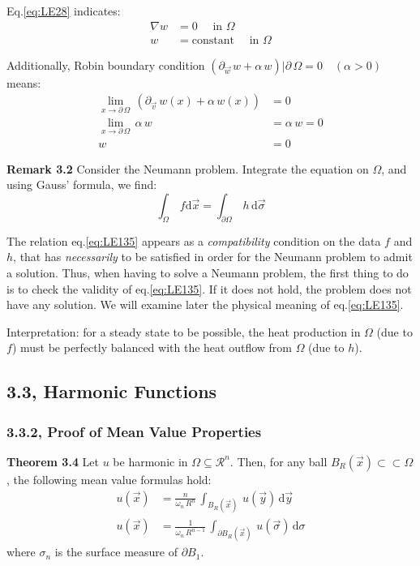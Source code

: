 \documentclass[../main.tex]{subfiles}
\begin{document}
Eq.\ref{eq:LE28} indicates:
\begin{align}
    \nabla w &= 0 \quad \text{ in  } \Omega \label{eq:LE30} \\
    w &= \text{constant} \quad \text{ in  } \Omega \label{eq:LE31}
\end{align}

Additionally, Robin boundary condition $(\partial_{\vec{w}} \, w + \alpha \, w)|\partial \, \Omega  = 0 \quad (\alpha > 0)$ means:
\begin{align}
    \lim_{x \rightarrow \partial \, \Omega} \,  (\partial_{\vec{v}} \, w(x) + \alpha \, w(x)) &= 0 \label{eq:LE32} \\
    \lim_{x \rightarrow \partial \, \Omega} \, \alpha \, w &= \alpha \, w = 0 \label{eq:LE33} \\
    w &= 0 \label{eq:LE34}
\end{align} \hfill \Box

\textbf{Remark 3.2}  Consider the Neumann problem. Integrate the equation on $\Omega$, and using Gauss' formula, we find:
\begin{equation} \label{eq:LE135}
    \int_{\Omega} \, f \mathrm{d} \vec{x} = \int_{\partial \Omega} \, h \, \mathrm{d} \vec{\sigma}
\end{equation} 

The relation eq.\ref{eq:LE135} appears as a \textit{compatibility} condition on the data $f$ and $h$, that has \textit{necessarily} to be satisfied in order for the Neumann problem to admit a solution. Thus, when having to solve a Neumann problem, the first thing to do is to check the validity of eq.\ref{eq:LE135}. If it does not hold, the problem does not have any solution. We will examine later the physical meaning of eq.\ref{eq:LE135}.

Interpretation: for a steady state to be possible, the heat production in $\Omega$ (due to $f$) must be perfectly balanced with the heat outflow from $\Omega$ (due to $h$). \hfill \Box

\subsection{3.3, Harmonic Functions}

\subsubsection{3.3.2, Proof of Mean Value Properties}

\textbf{Theorem 3.4}  Let $u$ be harmonic in $\Omega \subseteq \mathcal{R}^n$. Then, for any ball $B_R(\vec{x}) \subset \subset \Omega$, the following mean value formulas hold:
\begin{align}
    u(\vec{x}) &= \frac{n}{\omega_n \, R^n} \, \int_{B_R(\vec{x})} \, u(\vec{y}) \, \mathrm{d} \vec{y} \label{eq:LE35} \\
    u(\vec{x}) &= \frac{1}{\omega_n \, R^{n-1}} \, \int_{\partial B_R(\vec{x})} \, u(\vec{\sigma}) \, \mathrm{d} \sigma \label{eq:LE36}
\end{align}
where $\sigma_n$ is the surface measure of $\partial B_1$. \hfill \Box
\end{document}
